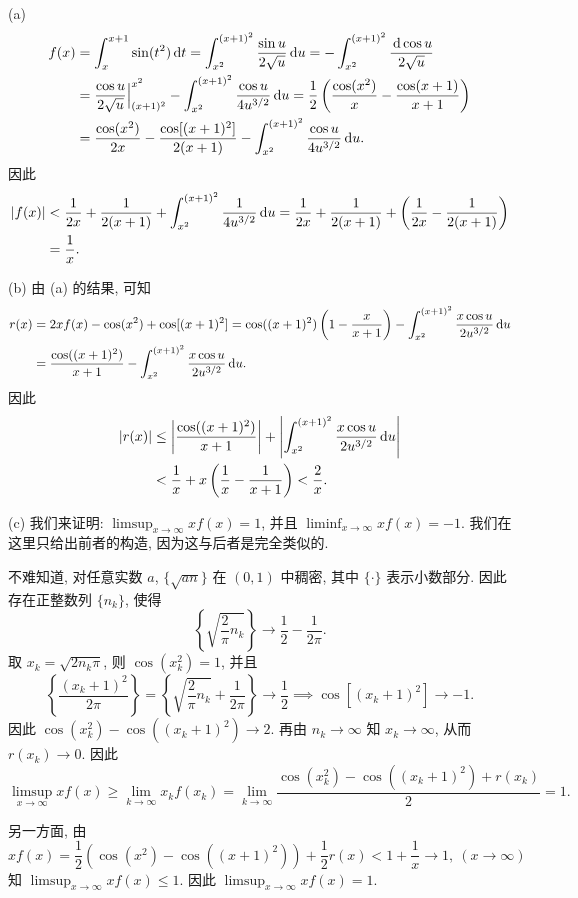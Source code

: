 \documentclass{article}
\begin{document}
\begin{solution}
  (a) 
  \begin{align*}
    f(x)
    &=\int_x^{x+1}\sin(t^2)\,\mathrm{d} t
    =\int_{x^2}^{(x+1)^2}\frac{\sin u}{2\sqrt{u}}\,\mathrm{d} u
    =-\int_{x^2}^{(x+1)^2}\frac{\,\mathrm{d}\cos u}{2\sqrt{u}}\\
    &=\frac{\cos u}{2\sqrt{u}}\Big|_{(x+1)^2}^{x^2}-\int_{x^2}^{(x+1)^2}\frac{\cos u}{4u^{3/2}}\,\mathrm{d} u
    =\frac{1}{2}\left( \frac{\cos(x^2)}{x}-\frac{\cos(x+1)}{x+1} \right)\\
    &=\frac{\cos(x^2)}{2x} - \frac{\cos[(x+1)^2]}{2(x+1)} - \int_{x^2}^{(x+1)^2} \frac{\cos u}{4u^{3/2}}\,\mathrm{d} u.
  \end{align*}
  因此
  \begin{align*}
    \left|f(x)\right|
    &< \frac{1}{2x}+\frac{1}{2(x+1)}+\int_{x^2}^{(x+1)^2}\frac{1}{4u^{3/2}}\,\mathrm{d} u
    =\frac{1}{2x}+\frac{1}{2(x+1)}+\left( \frac{1}{2x}-\frac{1}{2(x+1)} \right)\\
    &=\frac{1}{x}.
  \end{align*}

  (b) 由 (a) 的结果, 可知
  \begin{align*}
    r(x) 
    &= 2x f(x) - \cos(x^2) + \cos[(x+1)^2]
    = \cos((x+1)^2)\left( 1-\frac{x}{x+1} \right) - \int_{x^2}^{(x+1)^2}\frac{x\cos u}{2u^{3/2}}\,\mathrm{d} u\\
    &=\frac{\cos((x+1)^2)}{x+1}-\int_{x^2}^{(x+1)^2}\frac{x\cos u}{2u^{3/2}}\,\mathrm{d} u.
  \end{align*}
  因此
  \begin{align*}
    \left|r(x)\right|
    &\le\left|\frac{\cos((x+1)^2)}{x+1}\right|+\left|\int_{x^2}^{(x+1)^2}\frac{x\cos u}{2u^{3/2}}\,\mathrm{d} u\right|\\
    &<\frac{1}{x}+x\left( \frac{1}{x}-\frac{1}{x+1} \right)
    <\frac{2}{x}.
  \end{align*}

  (c) 我们来证明: \( \limsup_{x\to\infty}xf(x)=1 \), 并且 \( \liminf_{x\to\infty}xf(x)=-1 \). 我们在这里只给出前者的构造, 因为这与后者是完全类似的.

  不难知道, 对任意实数 \( a \), \( \{\sqrt{an}\} \) 在 \( (0,1) \) 中稠密, 其中 \( \{\cdot\} \) 表示小数部分. 因此存在正整数列 \( \{n_k\} \), 使得
  \[ \left\{\sqrt{\frac{2}{\pi}n_k}\right\} \to \frac{1}{2}-\frac{1}{2\pi}. \]
  取 \( x_k=\sqrt{2n_k\pi} \), 则 \( \cos(x_k^2)=1 \), 并且
  \[ \left\{ \frac{(x_k+1)^2}{2\pi} \right\}=\left\{ \sqrt{\frac{2}{\pi}n_k}+\frac{1}{2\pi} \right\}\to \frac{1}{2}
  \implies \cos[(x_k+1)^2] \to -1. \]
  因此 \( \cos(x_k^2)-\cos((x_k+1)^2)\to 2 \). 再由 \( n_k\to\infty \) 知 \( x_k\to\infty \), 从而 \( r(x_k)\to 0 \). 因此
  \[ \limsup_{x\to\infty}xf(x)\ge \lim_{k\to\infty}x_kf(x_k)=\lim_{k\to\infty}\frac{\cos(x_k^2)-\cos((x_k+1)^2)+r(x_k)}{2}=1. \]

  另一方面, 由
  \[ xf(x)=\frac{1}{2}\left( \cos(x^2)-\cos((x+1)^2) \right)+\frac{1}{2}r(x)<1+\frac{1}{x}\to 1,\ (x\to\infty) \]
  知 \( \limsup_{x\to\infty}xf(x)\le 1 \). 因此 \( \limsup_{x\to\infty}xf(x)=1 \).
\end{solution}
\end{document}
